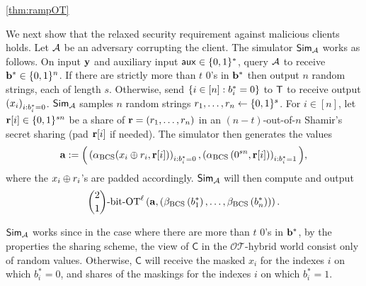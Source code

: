 \documentclass{llncs}
\newcommand{\OTfunc}{\mathcal{OT}}
\newcommand{\OThybrid}{\OTfunc\mbox{-}\text{hybrid}}
\newcommand{\bOT}[2]{\binom{#2}{#1}\text{-bit-OT}}
\newcommand{\stb}{\operatorname{BCS}}
\renewcommand{\b}{\myvec{b}}
\renewcommand{\a}{\myvec{a}}
\newcommand{\y}{\myvec{y}}
\newcommand{\aux}{\mathsf{aux}}
\newcommand{\srvr}{\alpha}
\newcommand{\clnt}{\beta}
\newcommand{\Cc}{\mathsf{C}}
\begin{document}
\begin{proofof}{\cref{thm:rampOT}}



We next show that the relaxed security requirement against malicious clients holds. Let $\mathcal{A}$ be an adversary corrupting the client. The simulator $\mathsf{Sim}_{\mathcal{A}}$ works as follows. On input $\y$ and auxiliary input $\aux\in\zo^*$, query $\mathcal{A}$ to receive $\b^*\in\zo^{n}$. If there are strictly more than $t$ 0's in $\b^*$ then output $n$ random strings, each of length $s$. Otherwise, send $\left\{i\in[n]:b^*_i=0\right\}$ to $\mathsf{T}$ to receive output $\left ( x_i \right )_{i:b^*_i=0}$. $\mathsf{Sim}_{\mathcal{A}}$ samples $n$ random strings $r_1,\ldots,r_n\leftarrow\{0,1\}^s$. For $i\in[n]$, let ${\bf r}[i]\in\{0,1\}^{sn}$ be a share of ${\bf r}=(r_1,\ldots,r_n)$ in an $(n-t)$-out-of-$n$ Shamir's secret sharing (pad ${\bf r}[i]$ if needed). The simulator then generates the values 
$$\a:=\Big(\vect{\srvr_{\stb}(x_i\xor r_i,\myvec{r}[i])}_{i:b^*_i=0},\vect{\srvr_{\stb}\of{0^{sn},\myvec{r}[i]}}_{i:b^*_i=1}\Big),$$
where the $x_i\oplus r_i$'s are padded accordingly. $\mathsf{Sim}_{\mathcal{A}}$ will then compute and output $$\bOT12^\ell\of{\a,\vect{\clnt_{\stb}\of{b^*_1},\ldots,\clnt_{\stb}\of{b^*_n}}}.$$

$\mathsf{Sim}_{\mathcal{A}}$ works since in the case where there are more than $t$ 0's in $\b^*$, by the properties the sharing scheme, the view of $\Cc$ in the $\OThybrid$ world consist only of random values. Otherwise, $\Cc$ will receive the masked $x_i$ for the indexes $i$ on which $b^*_i=0$, and shares of the maskings for the indexes $i$ on which $b^*_i=1$.

\end{proofof}
\end{document}
